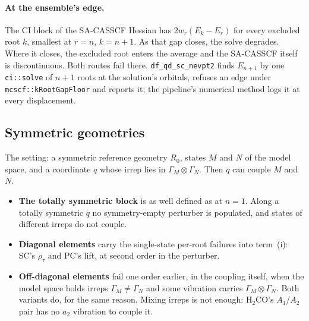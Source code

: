 \documentclass[11pt]{article}
\newcommand{\code}[1]{\texttt{#1}}
\begin{document}
\paragraph{At the ensemble's edge.} The CI block of the SA-CASSCF Hessian
has $2w_r(E_k - E_r)$ for every excluded root $k$, smallest at $r = n$,
$k = n + 1$. As that gap closes, the solve degrades. Where it closes, the
excluded root enters the average and the SA-CASSCF itself is
discontinuous. Both routes fail there. \code{df\_qd\_sc\_nevpt2} finds
$E_{n+1}$ by one \code{ci::solve} of $n + 1$ roots at the solution's
orbitals, refuses an edge under \code{mcscf::kRootGapFloor} and reports it;
the pipeline's numerical method logs it at every displacement.

\subsection{Symmetric geometries}
\label{sec:qd-sym}

The setting: a symmetric reference geometry $R_0$, states $M$ and $N$ of
the model space, and a coordinate $q$ whose irrep lies in
$\Gamma_M\otimes\Gamma_N$. Then $q$ can couple $M$ and $N$.
\begin{itemize}
\item \textbf{The totally symmetric block} is as well defined as at
  $n = 1$. Along a totally symmetric $q$ no symmetry-empty perturber is
  populated, and states of different irreps do not couple.
\item \textbf{Diagonal elements} carry the single-state per-root failures
  into term~(i): SC's $\rho_\tau$ and PC's lift, at second order in the
  perturber.
\item \textbf{Off-diagonal elements} fail one order earlier, in the
  coupling itself, when the model space holds irreps $\Gamma_M \neq
  \Gamma_N$ and some vibration carries $\Gamma_M\otimes\Gamma_N$. Both
  variants do, for the same reason. Mixing irreps is not enough: H$_2$CO's
  $A_1$/$A_2$ pair has no $a_2$ vibration to couple it.
\end{itemize}
\end{document}
